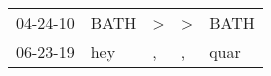 \begin{supertabular}{lllll}
 04-24-10 &  BATH &  \textgreater &  \textgreater &  BATH \\
 06-23-19 &   hey &             , &             , &  quar \\
\end{supertabular}
